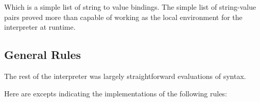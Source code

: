 \documentclass{l4proj}
\begin{document}
Which is a simple list of string to value bindings.
The simple list of string-value pairs proved more than capable of working as the local environment for the interpreter at runtime.









\subsection{General Rules}
The rest of the interpreter was largely straightforward evaluations of syntax.

Here are excepts indicating the implementations of the following rules:
\end{document}
